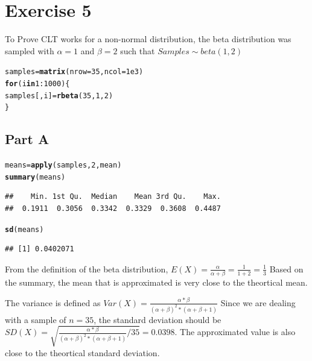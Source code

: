 \documentclass{article}\usepackage[]{graphicx}\usepackage[]{color}
\makeatletter
\newcommand{\hlnum}[1]{\textcolor[rgb]{0.686,0.059,0.569}{#1}}%
\newcommand{\hlopt}[1]{\textcolor[rgb]{0,0,0}{#1}}%
\newcommand{\hlstd}[1]{\textcolor[rgb]{0.345,0.345,0.345}{#1}}%
\newcommand{\hlkwa}[1]{\textcolor[rgb]{0.161,0.373,0.58}{\textbf{#1}}}%
\newcommand{\hlkwb}[1]{\textcolor[rgb]{0.69,0.353,0.396}{#1}}%
\newcommand{\hlkwc}[1]{\textcolor[rgb]{0.333,0.667,0.333}{#1}}%
\newcommand{\hlkwd}[1]{\textcolor[rgb]{0.737,0.353,0.396}{\textbf{#1}}}%
\newenvironment{kframe}{%
 \def\at@end@of@kframe{}%
 \ifinner\ifhmode%
  \def\at@end@of@kframe{\end{minipage}}%
  \begin{minipage}{\columnwidth}%
 \fi\fi%
 \def\FrameCommand##1{\hskip\@totalleftmargin \hskip-\fboxsep
 \colorbox{shadecolor}{##1}\hskip-\fboxsep
     \hskip-\linewidth \hskip-\@totalleftmargin \hskip\columnwidth}%
 \MakeFramed {\advance\hsize-\width
   \@totalleftmargin\z@ \linewidth\hsize
   \@setminipage}}%
 {\par\unskip\endMakeFramed%
 \at@end@of@kframe}
\newenvironment{knitrout}{}{} %
\makeatother
\begin{document}
\section*{Exercise 5}
To Prove CLT works for a non-normal distribution, the beta distribution was sampled with $\alpha = 1$ and $\beta=2$ such that $Samples \sim beta(1,2)$
\begin{knitrout}
\color{fgcolor}\begin{kframe}
\begin{alltt}
\hlstd{samples} \hlkwb{=} \hlkwd{matrix}\hlstd{(}\hlkwc{nrow} \hlstd{=} \hlnum{35}\hlstd{,} \hlkwc{ncol} \hlstd{=} \hlnum{1e3}\hlstd{)}
\hlkwa{for}\hlstd{(i} \hlkwa{in} \hlnum{1}\hlopt{:}\hlnum{1000}\hlstd{)\{}
  \hlstd{samples[,i]} \hlkwb{=} \hlkwd{rbeta}\hlstd{(}\hlnum{35}\hlstd{,} \hlnum{1}\hlstd{,}\hlnum{2}\hlstd{)}
\hlstd{\}}
\end{alltt}
\end{kframe}
\end{knitrout}
\subsection*{Part A}
\begin{knitrout}
\color{fgcolor}\begin{kframe}
\begin{alltt}
\hlstd{means} \hlkwb{=} \hlkwd{apply}\hlstd{(samples,} \hlnum{2}\hlstd{, mean)}
\hlkwd{summary}\hlstd{(means)}
\end{alltt}
\begin{verbatim}
##    Min. 1st Qu.  Median    Mean 3rd Qu.    Max. 
##  0.1911  0.3056  0.3342  0.3329  0.3608  0.4487
\end{verbatim}
\begin{alltt}
\hlkwd{sd}\hlstd{(means)}
\end{alltt}
\begin{verbatim}
## [1] 0.0402071
\end{verbatim}
\end{kframe}
\end{knitrout}
From the definition of the beta distribution, $E(X) = \frac{\alpha}{\alpha+\beta}=\frac{1}{1+2}=\frac{1}{3}$
Based on the summary, the mean that is approximated is very close to the theortical mean.

The variance is defined as $Var(X)=\frac{\alpha*\beta}{(\alpha+\beta)^2*(\alpha+\beta+1)}$ Since we are dealing with a sample of $n=35$, the standard deviation should be $SD(X)=\sqrt{\frac{\alpha*\beta}{(\alpha+\beta)^2*(\alpha+\beta+1)}/35}= 0.0398$. The approximated value is also close to the theortical standard deviation.
\end{document}
